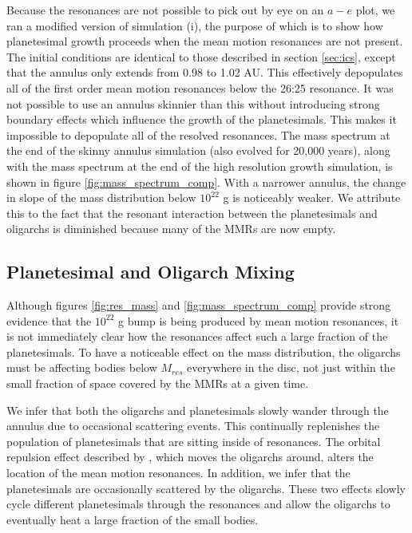 Because the resonances are not possible to pick out by eye on an $a-e$ plot, we ran a modified version of simulation (i), the 
purpose of which is to show how planetesimal growth proceeds when the mean motion resonances are not present. The initial 
conditions are identical to those described in section \ref{sec:ics}, except that the annulus only extends from 0.98 to 1.02 AU. 
This effectively depopulates all of the first order mean motion resonances below the 26:25 resonance. It was not possible to use 
an annulus skinnier than this without introducing strong boundary effects which influence the growth of the planetesimals. This 
makes it impossible to depopulate all of the resolved resonances. The mass spectrum at the end of the skinny annulus 
simulation (also evolved for 20,000 years), along with the mass spectrum at the end of the high resolution growth simulation, is 
shown in figure \ref{fig:mass_spectrum_comp}. With a narrower annulus, the change in slope of the mass distribution below 
$10^{22}$ g is noticeably weaker. We attribute this to the fact that the resonant interaction between the planetesimals and 
oligarchs is diminished because many of the MMRs are now empty.

\subsection{Planetesimal and Oligarch Mixing}\label{sec:mix}

Although figures \ref{fig:res_mass} and \ref{fig:mass_spectrum_comp} provide strong evidence that the $10^{22}$ g bump is 
being produced by mean motion resonances, it is not immediately clear how the resonances affect such a large fraction of the 
planetesimals. To have a noticeable effect on the mass distribution, the oligarchs must be affecting bodies below $M_{res}$ 
everywhere in the disc, not just within the small fraction of space covered by the MMRs at a given time.

We infer that both the oligarchs and planetesimals slowly wander through the annulus due to occasional scattering events. This 
continually replenishes the population of planetesimals that are sitting inside of resonances. The orbital repulsion effect 
described by \cite{kokubo98}, which moves the oligarchs around, alters the location of the mean motion resonances. 
In addition, we infer that the planetesimals are occasionally scattered by the oligarchs. These two effects slowly cycle different 
planetesimals through the resonances and allow the oligarchs to eventually heat a large fraction of the small bodies.

